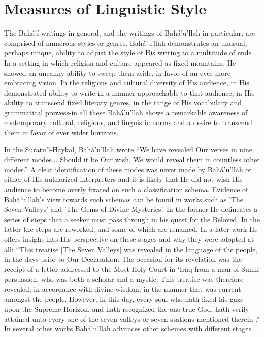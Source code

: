 \documentclass[12pt, oneside]{report}
\begin{document}
\section{Measures of Linguistic Style}
\par
The Bah\'{a}'\'{i} writings in general, and the writings of Bah\'{a}'u'llah in particular, are comprised of numerous styles or genres. Bah\'{a}'u'llah demonstrates an unusual, perhaps unique, ability to adjust the style of His writing to a multitude of ends.
In a setting in which religion and culture appeared as fixed mountains, He showed an uncanny ability to sweep them aside, in favor of an ever more embracing vision.
In the religious and cultural diversity of His audience, in His demonstrated ability to write in a manner approachable to that audience, in His ability to transcend fixed literary genres, in the range of His vocabulary and grammatical prowess-in all these Bah\'{a}'u'llah shows a remarkable awareness of contemporary cultural, religious, and linguistic norms and a desire to transcend them in favor of ever wider horizons.
\par
In the Suratu'l-Haykal, Bah\'{a}'u'llah wrote ``We have revealed Our verses in nine different modes... Should it be Our wish, We would reveal them in countless other modes.''
A clear identification of these modes was never made by Bah\'{a}'u'llah or either of His authorized interpreters and it is likely that He did not wish His audience to become overly fixated on such a classification schema.
Evidence of Bah\'{a}'u'llah's view towards such schemas can be found in works such as 'The Seven Valleys' and 'The Gems of Divine Mysteries'.
In the former He delineates a series of steps that a seeker must pass through in his quest for the Beloved.
In the latter the steps are reworked, and some of which are renamed.
In a later work He offers insight into His perspective on these stages and why they were adopted at all: ``This treatise [The Seven Valleys] was revealed in the language of the people, in the days prior to Our Declaration. The occasion for its revelation was the receipt of a letter addressed to the Most Holy Court in ‘Iráq from a man of Sunní persuasion, who was both a scholar and a mystic. This treatise was therefore revealed, in accordance with divine wisdom, in the manner that was current amongst the people. However, in this day, every soul who hath fixed his gaze upon the Supreme Horizon, and hath recognized the one true God, hath verily attained unto every one of the seven valleys or seven stations mentioned therein \cite{}.''
In several other works Bah\'{a}'u'llah advances other schemes with different stages.
\end{document}

